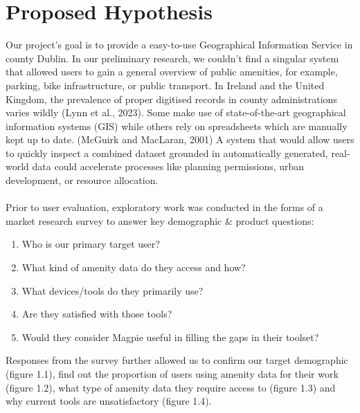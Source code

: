 \documentclass{report}
\begin{document}
\section{Proposed Hypothesis}
Our project's goal is to provide a easy-to-use Geographical Information Service
in county Dublin. In our preliminary research, we couldn’t find a singular
system that allowed users to gain a general overview of public amenities, for
example, parking, bike infrastructure, or public transport. In Ireland and the
United Kingdom, the prevalence of proper digitised records in county
administrations varies wildly (Lynn et al., 2023). Some make use of
state-of-the-art geographical information systems (GIS) while others rely on
spreadsheets which are manually kept up to date. (McGuirk and MacLaran, 2001) A
system that would allow users to quickly inspect a combined dataset grounded in
automatically generated, real-world data could accelerate processes like
planning permissions, urban development, or resource allocation.\\ \\
Prior to user evaluation, exploratory work was conducted in the forms of a
market research survey to answer key demographic \& product questions:
\begin{enumerate}
    \item Who is our primary target user?
    \item What kind of amenity data do they access and how?
    \item What devices/tools do they primarily use?
    \item Are they satisfied with those tools?
    \item Would they consider Magpie useful in filling the gaps in their
    toolset?
\end{enumerate}
Responses from the survey further allowed us to confirm our target demographic
(figure 1.1), find out the proportion of users using amenity data for their work
(figure 1.2), what type of amenity data  they require access to (figure 1.3) and
why current tools are unsatisfactory (figure 1.4).
\end{document}
